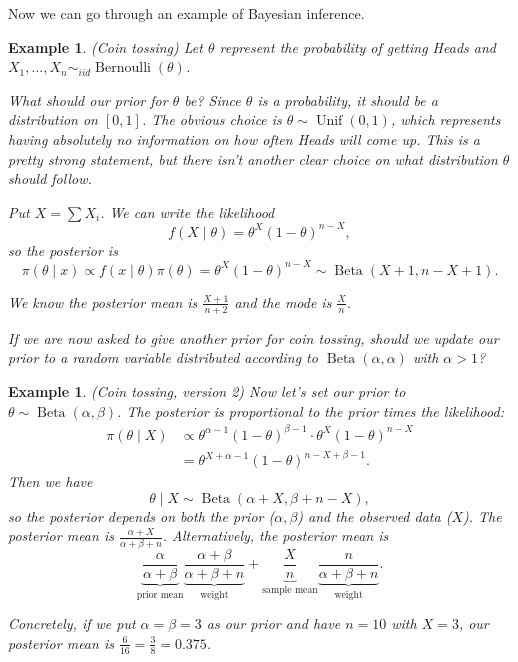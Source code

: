 \documentclass{tufte-handout}
\newtheorem{ex}[thm]{Example}
\theoremstyle{definition}
\begin{document}
Now we can go through an example of Bayesian inference.

\begin{ex}
	(Coin tossing) Let $\theta$ represent the probability of getting Heads and $X_1,\ldots,X_n\sim _{iid} \operatorname{Bernoulli}(\theta)$. 

	What should our prior for $\theta$ be? Since $\theta$ is a probability, it should be a distribution on $[0,1]$. The obvious choice is $\theta \sim \operatorname{Unif}(0,1)$, which represents having absolutely no information on how often Heads will come up. This is a pretty strong statement, but there isn't another clear choice on what distribution $\theta$ should follow.

	Put $X = \sum X_i$. We can write the likelihood \[
		f(X \mid \theta) = \theta^{X}\left( 1-\theta \right)^{n-X}
	,\] so the posterior is \[
		\pi(\theta \mid x) \propto f(x \mid \theta) \pi(\theta) = \theta^{X} \left( 1-\theta \right)^{n-X} \sim \operatorname{Beta}\left( X+1, n-X+1 \right)
	.\] 

	We know the posterior mean is $\frac{X+1}{n+2}$ and the mode is $\frac{X}{n}$.

	If we are now asked to give another prior for coin tossing, should we update our prior to a random variable distributed according to $\operatorname{Beta}(\alpha,\alpha)$ with $\alpha > 1$?

\end{ex}

\begin{ex}
	(Coin tossing, version 2) Now let's set our prior to $\theta \sim  \operatorname{Beta}(\alpha,\beta)$. The posterior is proportional to the prior times the likelihood: \begin{align*}
		\pi(\theta \mid X) &\propto \theta^{\alpha-1} (1-\theta)^{\beta-1} \cdot \theta^{X} \left( 1-\theta \right)^{n-X} \\
						   &= \theta^{X + \alpha-1} \left( 1-\theta \right)^{n - X + \beta - 1}
	.\end{align*}
	Then we have \[
		\theta \mid X \sim \operatorname{Beta} \left( \alpha + X, \beta + n - X \right)
	,\] so the posterior depends on both the prior ($\alpha,\beta$) and the observed data ($X$). The posterior mean is $\frac{\alpha+X}{\alpha+\beta+n}$. Alternatively, the posterior mean is \[
		\underbrace{\frac{\alpha}{\alpha+\beta}}_{\text{prior mean}} \underbrace{\frac{\alpha+\beta}{\alpha+\beta+n}}_{\text{weight}} + \underbrace{\frac{X}{n}}_{\text{sample mean}} \underbrace{\frac{n}{\alpha + \beta +n}}_{\text{weight}}
	.\] 

	Concretely, if we put $\alpha=\beta=3$ as our prior and have $n=10$ with $X=3$, our posterior mean is $\frac{6}{16} = \frac{3}{8} = 0.375$.
\end{ex}
\end{document}
